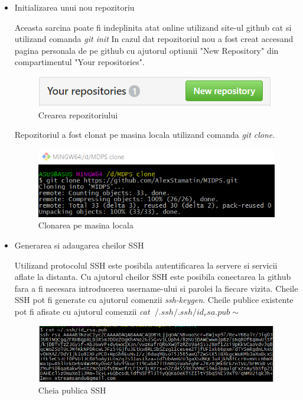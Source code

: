 \begin{itemize}
	\item Initializarea unui nou repozitoriu
		
		Aceasta sarcina poate fi indeplinita atat online utilizand site-ul github cat si utilizand comanda \textit{git init}
		In cazul dat repozitoriul nou a fost creat accesand pagina personala de pe github cu ajutorul optiunii "New Repository" din compartimentul "Your repositories".
		
		\begin{figure}[h]
			\centering
 			 \includegraphics[scale=0.75]{"task 1 create repo"}
 			 \caption{Crearea repozitoriului}
 			 \label{fig:create_repo}
		\end{figure}
\newpage
Repozitoriul a fost clonat pe masina locala utilizand comanda \textit{git clone}.

		\begin{figure}[h!]
			\centering
 			 \includegraphics[scale=0.75]{"task 1 cloning"}
 			 \caption{Clonarea pe masina locala}
 			 \label{fig:clone_repo}
		\end{figure}
		
\item Generarea si adaugarea cheilor SSH

Utilizand protocolul SSH este posibila autentificarea la servere si servicii aflate la distanta. Cu ajutorul cheilor SSH este posibila conectarea la github fara a fi necesara introducerea username-ului si parolei la fiecare vizita.
Cheile SSH pot fi generate cu ajutorul comenzii \textit{ssh-keygen}. Cheile publice existente pot fi afisate cu ajutorul comenzii \textit{cat $~/.ssh/.ssh/id_rsa.pub\sim$}

	\begin{figure}[h!]
			\centering
 			 \includegraphics[scale=0.75]{"task 2 SSH"}
 			 \caption{Cheia publica SSH}
 			 \label{fig:clone_repo}
		\end{figure}


\end{itemize}
